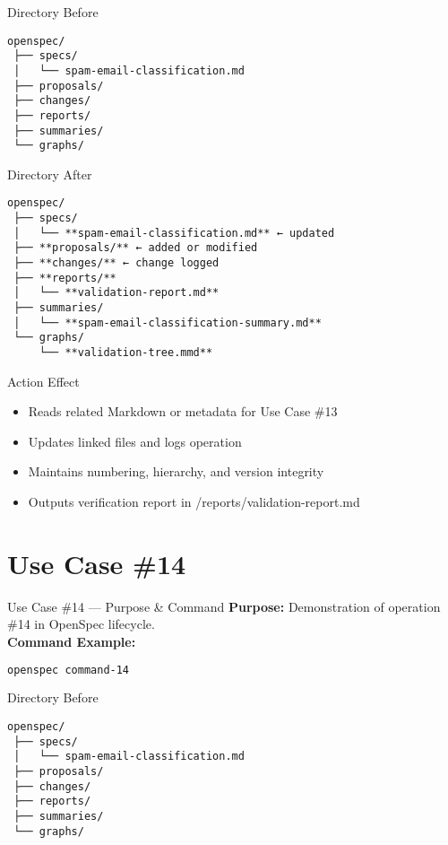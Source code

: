 \documentclass[aspectratio=169]{beamer}
\begin{document}
\begin{frame}{Directory Before}
\begin{lstlisting}
openspec/
 ├── specs/
 │   └── spam-email-classification.md
 ├── proposals/
 ├── changes/
 ├── reports/
 ├── summaries/
 └── graphs/
\end{lstlisting}
\end{frame}

\begin{frame}{Directory After}
\begin{lstlisting}
openspec/
 ├── specs/
 │   └── **spam-email-classification.md** ← updated
 ├── **proposals/** ← added or modified
 ├── **changes/** ← change logged
 ├── **reports/**
 │   └── **validation-report.md**
 ├── summaries/
 │   └── **spam-email-classification-summary.md**
 └── graphs/
     └── **validation-tree.mmd**
\end{lstlisting}
\end{frame}

\begin{frame}{Action Effect}
\begin{itemize}
  \item Reads related Markdown or metadata for Use Case \#13
  \item Updates linked files and logs operation
  \item Maintains numbering, hierarchy, and version integrity
  \item Outputs verification report in /reports/validation-report.md
\end{itemize}
\end{frame}

\section*{Use Case \#14}
\begin{frame}{Use Case \#14 --- Purpose \& Command}
\textbf{Purpose:} Demonstration of operation \#14 in OpenSpec lifecycle.\\[4pt]
\textbf{Command Example:}
\begin{lstlisting}[language=bash]
openspec command-14
\end{lstlisting}
\end{frame}

\begin{frame}{Directory Before}
\begin{lstlisting}
openspec/
 ├── specs/
 │   └── spam-email-classification.md
 ├── proposals/
 ├── changes/
 ├── reports/
 ├── summaries/
 └── graphs/
\end{lstlisting}
\end{frame}
\end{document}
